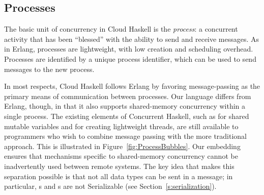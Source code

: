 \documentclass[preprint]{sigplanconf}
\begin{document}
\subsection{Processes}
\label{s:processes}

The basic unit of concurrency in Cloud Haskell is the {\em process}:  a concurrent activity that has been ``blessed'' with the ability to send and receive messages. As in Erlang, processes are lightweight, with low creation and scheduling overhead.  Processes are identified by a unique process identifier, which can be used to send messages to the new process.

In most respects, Cloud Haskell follows Erlang by favoring message-passing as the primary means of communication between processes. Our language differs from Erlang, though, in that it also supports shared-memory concurrency within a single process. The existing elements of Concurrent Haskell, such as  for shared mutable variables and  for creating lightweight threads, are still available to programmers who wish to combine message passing with the more traditional approach. This is illustrated in Figure~\ref{fig:ProcessBubbles}. Our embedding ensures that mechanisms specific to shared-memory concurrency cannot be inadvertently used between remote systems.  The key idea that makes this separation possible is that not all data types can be sent in a message; in particular, s and s are not Serializable (see Section~\ref{s:serialization}).
\end{document}
